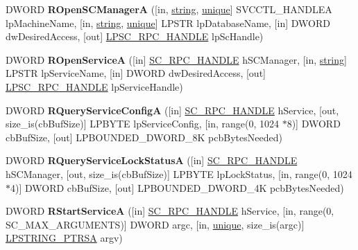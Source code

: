 \begin{DoxyCompactItemize}
\item 
\mbox{\label{interfacesvcctl_ad6e3e785aeaf16b8ba71033dfc8f2750}} 
D\+W\+O\+RD {\bfseries R\+Open\+S\+C\+ManagerA} (\mbox{[}in, \hyperlink{structstring}{string}, \hyperlink{interfaceunique}{unique}\mbox{]} S\+V\+C\+C\+T\+L\+\_\+\+H\+A\+N\+D\+L\+EA lp\+Machine\+Name, \mbox{[}in, \hyperlink{structstring}{string}, \hyperlink{interfaceunique}{unique}\mbox{]} L\+P\+S\+TR lp\+Database\+Name, \mbox{[}in\mbox{]} D\+W\+O\+RD dw\+Desired\+Access, \mbox{[}out\mbox{]} \hyperlink{interfacevoid}{L\+P\+S\+C\+\_\+\+R\+P\+C\+\_\+\+H\+A\+N\+D\+LE} lp\+Sc\+Handle)
\item 
\mbox{\label{interfacesvcctl_adc17a4d2bc60567a8b37024d4de0c75e}} 
D\+W\+O\+RD {\bfseries R\+Open\+ServiceA} (\mbox{[}in\mbox{]} \hyperlink{interfacevoid}{S\+C\+\_\+\+R\+P\+C\+\_\+\+H\+A\+N\+D\+LE} h\+S\+C\+Manager, \mbox{[}in, \hyperlink{structstring}{string}\mbox{]} L\+P\+S\+TR lp\+Service\+Name, \mbox{[}in\mbox{]} D\+W\+O\+RD dw\+Desired\+Access, \mbox{[}out\mbox{]} \hyperlink{interfacevoid}{L\+P\+S\+C\+\_\+\+R\+P\+C\+\_\+\+H\+A\+N\+D\+LE} lp\+Service\+Handle)
\item 
\mbox{\label{interfacesvcctl_ac2ecf16e2173e71bc3bd6b64c67c0a96}} 
D\+W\+O\+RD {\bfseries R\+Query\+Service\+ConfigA} (\mbox{[}in\mbox{]} \hyperlink{interfacevoid}{S\+C\+\_\+\+R\+P\+C\+\_\+\+H\+A\+N\+D\+LE} h\+Service, \mbox{[}out, size\+\_\+is(cb\+Buf\+Size)\mbox{]} L\+P\+B\+Y\+TE lp\+Service\+Config, \mbox{[}in, range(0, 1024 $\ast$8)\mbox{]} D\+W\+O\+RD cb\+Buf\+Size, \mbox{[}out\mbox{]} L\+P\+B\+O\+U\+N\+D\+E\+D\+\_\+\+D\+W\+O\+R\+D\+\_\+8K pcb\+Bytes\+Needed)
\item 
\mbox{\label{interfacesvcctl_a28dad56a269c1f3d02047faac837794c}} 
D\+W\+O\+RD {\bfseries R\+Query\+Service\+Lock\+StatusA} (\mbox{[}in\mbox{]} \hyperlink{interfacevoid}{S\+C\+\_\+\+R\+P\+C\+\_\+\+H\+A\+N\+D\+LE} h\+S\+C\+Manager, \mbox{[}out, size\+\_\+is(cb\+Buf\+Size)\mbox{]} L\+P\+B\+Y\+TE lp\+Lock\+Status, \mbox{[}in, range(0, 1024 $\ast$4)\mbox{]} D\+W\+O\+RD cb\+Buf\+Size, \mbox{[}out\mbox{]} L\+P\+B\+O\+U\+N\+D\+E\+D\+\_\+\+D\+W\+O\+R\+D\+\_\+4K pcb\+Bytes\+Needed)
\item 
\mbox{\label{interfacesvcctl_ad88d2d388cba8ef2e0610dc9e9f63bc9}} 
D\+W\+O\+RD {\bfseries R\+Start\+ServiceA} (\mbox{[}in\mbox{]} \hyperlink{interfacevoid}{S\+C\+\_\+\+R\+P\+C\+\_\+\+H\+A\+N\+D\+LE} h\+Service, \mbox{[}in, range(0, S\+C\+\_\+\+M\+A\+X\+\_\+\+A\+R\+G\+U\+M\+E\+N\+TS)\mbox{]} D\+W\+O\+RD argc, \mbox{[}in, \hyperlink{interfaceunique}{unique}, size\+\_\+is(argc)\mbox{]} \hyperlink{struct___s_t_r_i_n_g___p_t_r_s_a}{L\+P\+S\+T\+R\+I\+N\+G\+\_\+\+P\+T\+R\+SA} argv)

\end{DoxyCompactItemize}
